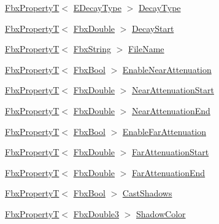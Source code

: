 \begin{DoxyCompactItemize}
\item 
\hyperlink{class_fbx_property_t}{Fbx\+PropertyT}$<$ \hyperlink{class_fbx_light_a940254a9a826ab44a4cde044db1b3875}{E\+Decay\+Type} $>$ \hyperlink{class_fbx_light_aef58f45dfa9e83866792ed63b3e8ba21}{Decay\+Type}
\item 
\hyperlink{class_fbx_property_t}{Fbx\+PropertyT}$<$ \hyperlink{fbxtypes_8h_a171e72a1c46fc15c1a6c9c31948c1c5b}{Fbx\+Double} $>$ \hyperlink{class_fbx_light_a33459f3a22c886508580c8879ee6cb54}{Decay\+Start}
\item 
\hyperlink{class_fbx_property_t}{Fbx\+PropertyT}$<$ \hyperlink{class_fbx_string}{Fbx\+String} $>$ \hyperlink{class_fbx_light_aeb6d0d316710f03e0f4aeb0376e1e376}{File\+Name}
\item 
\hyperlink{class_fbx_property_t}{Fbx\+PropertyT}$<$ \hyperlink{fbxtypes_8h_a92e0562b2fe33e76a242f498b362262e}{Fbx\+Bool} $>$ \hyperlink{class_fbx_light_ae9bf8b3fa56b50962615f78e999f3371}{Enable\+Near\+Attenuation}
\item 
\hyperlink{class_fbx_property_t}{Fbx\+PropertyT}$<$ \hyperlink{fbxtypes_8h_a171e72a1c46fc15c1a6c9c31948c1c5b}{Fbx\+Double} $>$ \hyperlink{class_fbx_light_aaad5d9617b23e08933e5360c948b3d26}{Near\+Attenuation\+Start}
\item 
\hyperlink{class_fbx_property_t}{Fbx\+PropertyT}$<$ \hyperlink{fbxtypes_8h_a171e72a1c46fc15c1a6c9c31948c1c5b}{Fbx\+Double} $>$ \hyperlink{class_fbx_light_adb8b8187ea6c10eca1c82d1a2b769d53}{Near\+Attenuation\+End}
\item 
\hyperlink{class_fbx_property_t}{Fbx\+PropertyT}$<$ \hyperlink{fbxtypes_8h_a92e0562b2fe33e76a242f498b362262e}{Fbx\+Bool} $>$ \hyperlink{class_fbx_light_a65848a9a9d7afb4c576efa5376138a06}{Enable\+Far\+Attenuation}
\item 
\hyperlink{class_fbx_property_t}{Fbx\+PropertyT}$<$ \hyperlink{fbxtypes_8h_a171e72a1c46fc15c1a6c9c31948c1c5b}{Fbx\+Double} $>$ \hyperlink{class_fbx_light_ac28fb5441eded0c0cf73d1e3efcf92bc}{Far\+Attenuation\+Start}
\item 
\hyperlink{class_fbx_property_t}{Fbx\+PropertyT}$<$ \hyperlink{fbxtypes_8h_a171e72a1c46fc15c1a6c9c31948c1c5b}{Fbx\+Double} $>$ \hyperlink{class_fbx_light_a2bb8f1a2eaba27196db363efe4cae050}{Far\+Attenuation\+End}
\item 
\hyperlink{class_fbx_property_t}{Fbx\+PropertyT}$<$ \hyperlink{fbxtypes_8h_a92e0562b2fe33e76a242f498b362262e}{Fbx\+Bool} $>$ \hyperlink{class_fbx_light_a9ab7648e8c96d34f4feb5c76c52987ce}{Cast\+Shadows}
\item 
\hyperlink{class_fbx_property_t}{Fbx\+PropertyT}$<$ \hyperlink{fbxtypes_8h_ae0a96f14cde566774c7553aa7523b7a7}{Fbx\+Double3} $>$ \hyperlink{class_fbx_light_aeb8d7f6d6fa57f4dc86ff8e47ff61dbf}{Shadow\+Color}

\end{DoxyCompactItemize}
